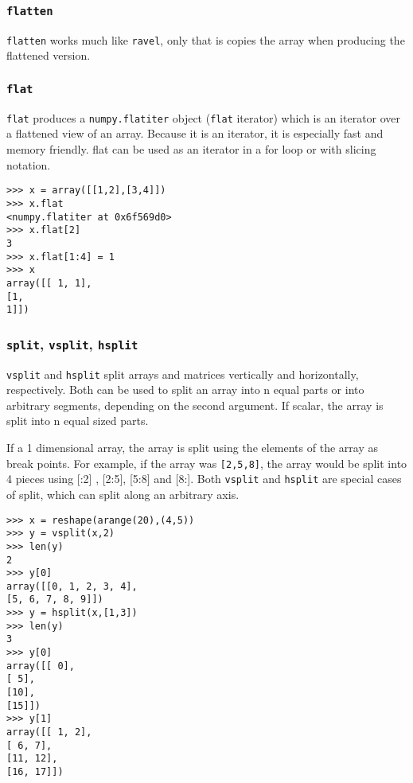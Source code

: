 \documentclass[Pydata.tex]{subfiles}
\begin{document}
\subsubsection*{\texttt{flatten}}
\texttt{flatten} works much like \texttt{ravel}, only that is copies the array when producing the flattened version.

\subsubsection*{\texttt{flat}}
\texttt{flat} produces a \texttt{numpy.flatiter} object (\texttt{flat} iterator) which is an iterator over a flattened view of an array.
Because it is an iterator, it is especially fast and memory friendly. flat can be used as an iterator in a for
loop or with slicing notation.
\begin{framed}
\begin{verbatim}
>>> x = array([[1,2],[3,4]])
>>> x.flat
<numpy.flatiter at 0x6f569d0>
>>> x.flat[2]
3
>>> x.flat[1:4] = 1
>>> x
array([[ 1, 1],
[1,
1]])
\end{verbatim}
\end{framed}

\subsubsection*{\texttt{split}, \texttt{vsplit}, \texttt{hsplit}}
\texttt{vsplit} and \texttt{hsplit} split arrays and matrices vertically and horizontally, respectively. Both can be used to
split an array into n equal parts or into arbitrary segments, depending on the second argument. If scalar,
the array is split into n equal sized parts. 

\noindent If a 1 dimensional array, the array is split using the elements of
the array as break points. For example, if the array was \texttt{[2,5,8]}, the array would be split into 4 pieces using
[:2] , [2:5], [5:8] and [8:]. Both \texttt{vsplit} and \texttt{hsplit} are special cases of split, which can split along an
arbitrary axis.
\begin{framed}
\begin{verbatim}
>>> x = reshape(arange(20),(4,5))
>>> y = vsplit(x,2)
>>> len(y)
2
>>> y[0]
array([[0, 1, 2, 3, 4],
[5, 6, 7, 8, 9]])
>>> y = hsplit(x,[1,3])
>>> len(y)
3
>>> y[0]
array([[ 0],
[ 5],
[10],
[15]])
>>> y[1]
array([[ 1, 2],
[ 6, 7],
[11, 12],
[16, 17]])
\end{verbatim}
\end{framed}
\end{document}
